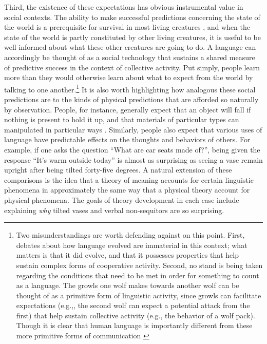 Third, the existence of these expectations has obvious instrumental value in social contexts. The ability to make successful predictions concerning the state of the world is a prerequisite for survival in most living creatures \citep{clark:2013,Dennett:1987}, and when the state of the world is partly constituted by other living creatures, it is useful to be well informed about what these other creatures are going to do. A language can accordingly be thought of as a social technology that sustains a shared measure of predictive success in the context of collective activity. Put simply, people learn more than they would otherwise learn about what to expect from the world by talking to one another.\footnote{Two misunderstandings are worth defending against on this point. First, debates about how language evolved are immaterial in this context; what matters is that it did evolve, and that it possesses properties that help sustain complex forms of cooperative activity. Second, no stand is being taken regarding the conditions that need to be met in order for something to count as a language. The growls one wolf makes towards another wolf can be thought of as a primitive form of linguistic activity, since growls can facilitate expectations (e.g.,, the second wolf can expect a potential attack from the first) that help sustain collective activity (e.g., the behavior of a wolf pack). Though it is clear that human language is importantly different from these more primitive forms of communication \citep{Pinker:1994,Harley:2014}} It is also worth highlighting how analogous these social predictions are to the kinds of physical predictions that are afforded so naturally by observation. People, for instance, generally expect that an object will fall if nothing is present to hold it up, and that materials of particular types can manipulated in particular ways \citep{Dennett:1987}. Similarly, people also expect that various uses of language have predictable effects on the thoughts and behaviors of others. For example, if one asks the question ``What are car seats made of?'', being given the response ``It's warm outside today'' is almost as surprising as seeing a vase remain upright after being tilted forty-five degrees. A natural extension of these comparisons is the idea that a theory of meaning accounts for certain linguistic phenomena in approximately the same way that a physical theory account for physical phenomena. The goals of theory development in each case include explaining \textit{why} tilted vases and verbal non-sequitors are so surprising. 

